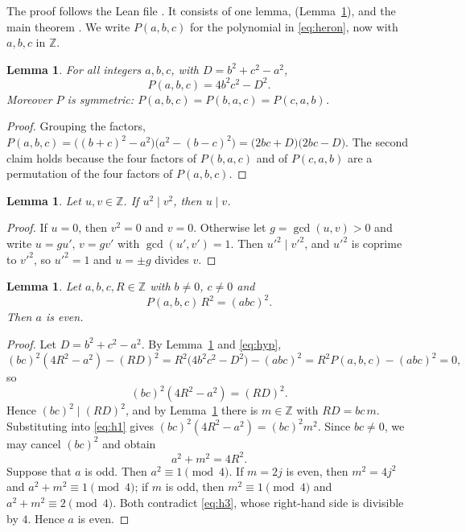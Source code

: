 \documentclass[11pt]{amsart}
\theoremstyle{plain}
\newtheorem{lemma}[theorem]{Lemma}
\theoremstyle{definition}
\newcommand{\Z}{\mathbb{Z}}
\begin{document}
The proof follows the Lean file . It consists of one lemma,  (Lemma~\ref{lem:key}), and the main theorem . We write $P(a,b,c)$ for the polynomial in \eqref{eq:heron}, now with $a,b,c$ in $\Z$.

\begin{lemma}\label{lem:identity}
For all integers $a,b,c$, with $D=b^2+c^2-a^2$,
\[
  P(a,b,c)=4b^2c^2-D^2 .
\]
Moreover $P$ is symmetric: $P(a,b,c)=P(b,a,c)=P(c,a,b)$.
\end{lemma}

\begin{proof}
Grouping the factors, $P(a,b,c)=\bigl((b+c)^2-a^2\bigr)\bigl(a^2-(b-c)^2\bigr)=\bigl(2bc+D\bigr)\bigl(2bc-D\bigr)$. The second claim holds because the four factors of $P(b,a,c)$ and of $P(c,a,b)$ are a permutation of the four factors of $P(a,b,c)$.
\end{proof}

\begin{lemma}\label{lem:sq}
Let $u,v\in\Z$. If $u^2\mid v^2$, then $u\mid v$.
\end{lemma}

\begin{proof}
If $u=0$, then $v^2=0$ and $v=0$. Otherwise let $g=\gcd(u,v)>0$ and write $u=gu'$, $v=gv'$ with $\gcd(u',v')=1$. Then $u'^2\mid v'^2$, and $u'^2$ is coprime to $v'^2$, so $u'^2=1$ and $u=\pm g$ divides $v$.
\end{proof}

\begin{lemma}\label{lem:key}
Let $a,b,c,R\in\Z$ with $b\ne0$, $c\ne0$ and
\begin{equation}\label{eq:hyp}
  P(a,b,c)\,R^2=(abc)^2 .
\end{equation}
Then $a$ is even.
\end{lemma}

\begin{proof}
Let $D=b^2+c^2-a^2$. By Lemma~\ref{lem:identity} and \eqref{eq:hyp},
\[
  (bc)^2(4R^2-a^2)-(RD)^2=R^2\bigl(4b^2c^2-D^2\bigr)-(abc)^2=R^2P(a,b,c)-(abc)^2=0,
\]
so
\begin{equation}\label{eq:h1}
  (bc)^2(4R^2-a^2)=(RD)^2 .
\end{equation}
Hence $(bc)^2\mid(RD)^2$, and by Lemma~\ref{lem:sq} there is $m\in\Z$ with $RD=bc\,m$. Substituting into \eqref{eq:h1} gives $(bc)^2(4R^2-a^2)=(bc)^2m^2$. Since $bc\ne0$, we may cancel $(bc)^2$ and obtain
\begin{equation}\label{eq:h3}
  a^2+m^2=4R^2 .
\end{equation}
Suppose that $a$ is odd. Then $a^2\equiv1\pmod4$. If $m=2j$ is even, then $m^2=4j^2$ and $a^2+m^2\equiv1\pmod4$; if $m$ is odd, then $m^2\equiv1\pmod 4$ and $a^2+m^2\equiv2\pmod4$. Both contradict \eqref{eq:h3}, whose right-hand side is divisible by $4$. Hence $a$ is even.
\end{proof}
\end{document}
